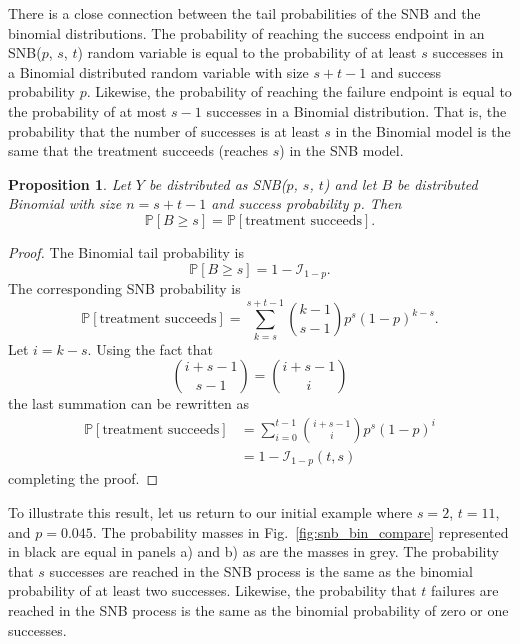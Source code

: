 \documentclass[review]{elsarticle}
\newtheorem{prop}{Proposition}
\begin{document}
There is a close connection between the tail probabilities of the SNB and the 
binomial distributions.
The probability of reaching the success endpoint in an 
SNB($p$, $s$, $t$) random variable is 
equal to the probability of at least $s$ successes in a Binomial distributed 
random variable with size $s+t-1$ and success probability $p$. 
Likewise, the probability of reaching the failure endpoint is equal
to the probability of at most $s-1$ successes in a Binomial distribution. 
That is, the probability that the number of successes is at least $s$ in the 
Binomial model is the same that the treatment succeeds (reaches $s$) in the SNB 
model.
\begin{prop} \label{binomial_tail}
Let $Y$ be distributed as SNB($p$, $s$, $t$) and let 
$B$ be distributed Binomial with size $n=s+t-1$ and success probability
$p$. Then
\begin{equation}
\mathbb{P}[B \geq s] = \mathbb{P} [\text{treatment succeeds}].
\end{equation}
\end{prop}
\begin{proof}
The Binomial tail probability is
\begin{equation*}
\mathbb{P}[B \geq s] = 1 - \mathcal{I}_{1-p}.
\end{equation*}
The corresponding SNB probability is
\begin{equation*}
\mathbb{P} [\text{treatment succeeds}] 
  = \sum_{k=s}^{s+t-1} {k-1 \choose s-1} p^s (1-p)^{k-s}.
\end{equation*}
Let $i=k-s$. Using the fact that
\begin{equation*}
{i+s-1 \choose s-1} = {i+s-1 \choose i}
\end{equation*}
the last summation can be rewritten as
\begin{align}
\mathbb{P} [\text{treatment succeeds}] &= \sum_{i=0}^{t-1} 
  {i+s-1 \choose i} p^s (1-p)^i\\
  &= 1 - \mathcal{I}_{1-p}(t, s)
\end{align}
completing the proof.
\end{proof}

To illustrate this result, let us return to our initial example
where $s=2$, $t=11$, and $p=0.045$.  The probability masses in
Fig.~\ref{fig:snb_bin_compare} represented in 
black are equal in panels a) and b) as are the masses in grey.
The probability that $s$
successes are reached in the SNB process is the same as the binomial 
probability of at least two successes. Likewise, the probability that $t$ 
failures are reached in the SNB process is the same as the binomial
probability of zero or one successes.
\end{document}
